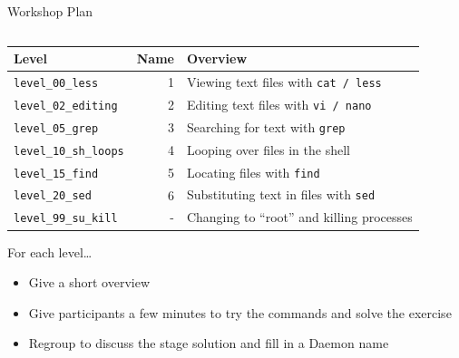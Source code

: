 \documentclass[mathserif]{beamer}
\begin{document}
\begin{frame}[label={sec:org302bd76},fragile]{Workshop Plan}
 \vspace{-.2in}
\begin{columns}
\begin{column}{1.1\columnwidth}
\begin{block}{}
\begin{center}
\begin{tabular}{lrl}
\hline
Level & Name & Overview\\[0pt]
\hline
\texttt{level\_00\_less} & 1 & Viewing text files with \texttt{cat / less}\\[0pt]
\texttt{level\_02\_editing} & 2 & Editing text files with \texttt{vi / nano}\\[0pt]
\texttt{level\_05\_grep} & 3 & Searching for text with \texttt{grep}\\[0pt]
\texttt{level\_10\_sh\_loops} & 4 & Looping over files in the shell\\[0pt]
\texttt{level\_15\_find} & 5 & Locating files with \texttt{find}\\[0pt]
\texttt{level\_20\_sed} & 6 & Substituting text in files with \texttt{sed}\\[0pt]
\texttt{level\_99\_su\_kill} & - & Changing to ``root'' and killing processes\\[0pt]
\hline
\end{tabular}
\end{center}

For each level\ldots{}
\begin{itemize}
\item Give a short overview
\item Give participants a few minutes to try the commands and solve the exercise
\item Regroup to discuss the stage solution and fill in a Daemon name
\end{itemize}
\end{block}
\end{column}
\end{columns}
\end{frame}
\end{document}
